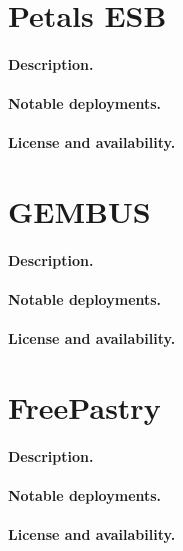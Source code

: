 \documentclass[a4paper]{report}
\begin{document}
\section{Petals ESB}

\paragraph{Description.}

\paragraph{Notable deployments.}

\paragraph{License and availability.}


\section{GEMBUS}

\paragraph{Description.}

\paragraph{Notable deployments.}

\paragraph{License and availability.}


\section{FreePastry}

\paragraph{Description.}

\paragraph{Notable deployments.}

\paragraph{License and availability.}
\end{document}

